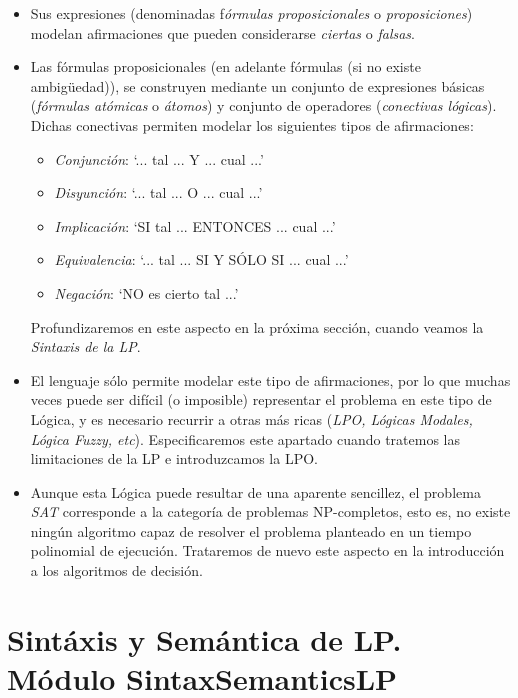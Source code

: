 \documentclass[a4paper]{report}
\begin{document}
\begin{itemize}
\item Sus expresiones (denominadas f\textit{órmulas proposicionales} o \textit{proposiciones}) modelan afirmaciones que pueden considerarse \textit{ciertas} o \textit{falsas}.

\item Las fórmulas proposicionales (en adelante fórmulas (si no existe ambigüedad)), se construyen mediante un conjunto de expresiones básicas (\textit{fórmulas atómicas} o \textit{átomos}) y conjunto de operadores (\textit{conectivas lógicas}). Dichas conectivas permiten modelar los siguientes tipos de afirmaciones:

\begin{itemize}
\item \textit{Conjunción}: `... tal ... Y ... cual ...'

\item \textit{Disyunción}: `... tal ... O ... cual ...'

\item \textit{Implicación}: `SI tal ... ENTONCES ... cual ...'

\item \textit{Equivalencia}: `... tal ... SI Y SÓLO SI ... cual ...'
\item \textit{Negación}: `NO es cierto tal ...'
\end{itemize}

Profundizaremos en este aspecto en la próxima sección, cuando veamos la \textit{Sintaxis de la LP}.

\item El lenguaje sólo permite modelar este tipo de afirmaciones, por lo que muchas veces puede ser difícil (o imposible) representar el problema en este tipo de Lógica, y es necesario recurrir a otras más ricas (\textit{LPO, Lógicas Modales, Lógica Fuzzy, etc}). Especificaremos este apartado cuando tratemos las limitaciones de la LP e introduzcamos la LPO.

\item Aunque esta Lógica puede resultar de una aparente sencillez, el problema \textit{SAT} corresponde a la categoría de problemas NP-completos, esto es, no existe ningún algoritmo capaz de resolver el problema planteado en un tiempo polinomial de ejecución. Trataremos de nuevo este aspecto en la introducción a los algoritmos de decisión.

\end{itemize}

\section{Sintáxis y Semántica de LP. Módulo SintaxSemanticsLP}
\end{document}
